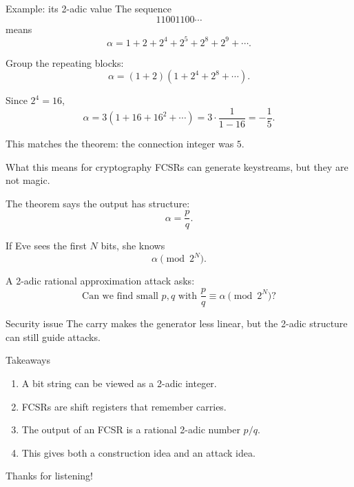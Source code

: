 \documentclass[aspectratio=169]{beamer}
\begin{document}
\begin{frame}{Example: its 2-adic value}
The sequence
\[
  11001100\cdots
\]
means
\[
  \alpha=1+2+2^4+2^5+2^8+2^9+\cdots.
\]

Group the repeating blocks:
\[
  \alpha=(1+2)(1+2^4+2^8+\cdots).
\]

Since $2^4=16$,
\[
  \alpha=3(1+16+16^2+\cdots)
  =3\cdot \frac{1}{1-16}
  =-\frac{1}{5}.
\]

This matches the theorem: the connection integer was $5$.
\end{frame}

\begin{frame}{What this means for cryptography}
FCSRs can generate keystreams, but they are not magic.

\vspace{0.2cm}
The theorem says the output has structure:
\[
  \alpha=\frac{p}{q}.
\]

If Eve sees the first $N$ bits, she knows
\[
  \alpha \pmod{2^N}.
\]

A 2-adic rational approximation attack asks:
\[
  \text{Can we find small }p,q\text{ with }\frac{p}{q}\equiv \alpha \pmod{2^N}?
\]

\begin{alertblock}{Security issue}
The carry makes the generator less linear, but the 2-adic structure can still guide attacks.
\end{alertblock}
\end{frame}

\begin{frame}{Takeaways}
\begin{enumerate}
  \item A bit string can be viewed as a 2-adic integer.
  \item FCSRs are shift registers that remember carries.
  \item The output of an FCSR is a rational 2-adic number $p/q$.
  \item This gives both a construction idea and an attack idea.
\end{enumerate}

\vfill
\centering
Thanks for listening!
\end{frame}
\end{document}
